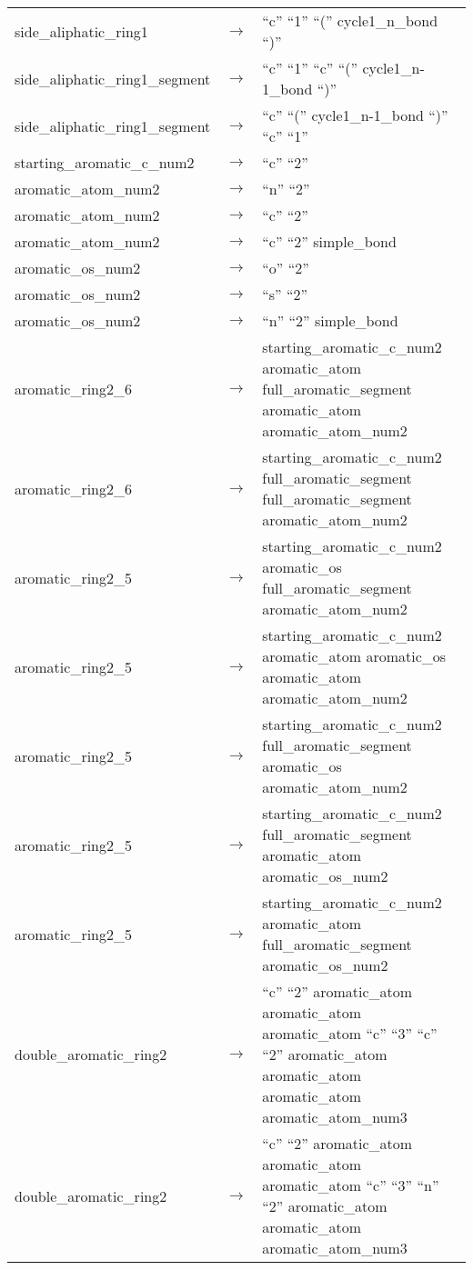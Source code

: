 \begin{longtable}{m{} p{} p{}}
    side\_aliphatic\_ring1 & $\rightarrow$ & ``c'' ``1'' ``('' cycle1\_n\_bond ``)'' \\
    side\_aliphatic\_ring1\_segment & $\rightarrow$ & ``c'' ``1'' ``c'' ``('' cycle1\_n-1\_bond ``)'' \\
    side\_aliphatic\_ring1\_segment & $\rightarrow$ & ``c'' ``('' cycle1\_n-1\_bond ``)'' ``c'' ``1'' \\
    starting\_aromatic\_c\_num2 & $\rightarrow$ & ``c'' ``2'' \\
    aromatic\_atom\_num2 & $\rightarrow$ & ``n'' ``2'' \\
    aromatic\_atom\_num2 & $\rightarrow$ & ``c'' ``2'' \\
    aromatic\_atom\_num2 & $\rightarrow$ & ``c'' ``2'' simple\_bond \\
    aromatic\_os\_num2 & $\rightarrow$ & ``o'' ``2'' \\
    aromatic\_os\_num2 & $\rightarrow$ & ``s'' ``2'' \\
    aromatic\_os\_num2 & $\rightarrow$ & ``n'' ``2'' simple\_bond \\
    aromatic\_ring2\_6 & $\rightarrow$ & starting\_aromatic\_c\_num2 aromatic\_atom full\_aromatic\_segment aromatic\_atom aromatic\_atom\_num2 \\
    aromatic\_ring2\_6 & $\rightarrow$ & starting\_aromatic\_c\_num2 full\_aromatic\_segment full\_aromatic\_segment aromatic\_atom\_num2 \\
    aromatic\_ring2\_5 & $\rightarrow$ & starting\_aromatic\_c\_num2 aromatic\_os full\_aromatic\_segment aromatic\_atom\_num2 \\
    aromatic\_ring2\_5 & $\rightarrow$ & starting\_aromatic\_c\_num2 aromatic\_atom aromatic\_os aromatic\_atom aromatic\_atom\_num2 \\
    aromatic\_ring2\_5 & $\rightarrow$ & starting\_aromatic\_c\_num2 full\_aromatic\_segment aromatic\_os aromatic\_atom\_num2 \\
    aromatic\_ring2\_5 & $\rightarrow$ & starting\_aromatic\_c\_num2 full\_aromatic\_segment aromatic\_atom aromatic\_os\_num2 \\
    aromatic\_ring2\_5 & $\rightarrow$ & starting\_aromatic\_c\_num2 aromatic\_atom full\_aromatic\_segment aromatic\_os\_num2 \\
    double\_aromatic\_ring2 & $\rightarrow$ & ``c'' ``2'' aromatic\_atom aromatic\_atom aromatic\_atom ``c'' ``3'' ``c'' ``2'' aromatic\_atom aromatic\_atom aromatic\_atom aromatic\_atom\_num3 \\
    double\_aromatic\_ring2 & $\rightarrow$ & ``c'' ``2'' aromatic\_atom aromatic\_atom aromatic\_atom ``c'' ``3'' ``n'' ``2'' aromatic\_atom aromatic\_atom aromatic\_atom\_num3 \\

\end{longtable}
